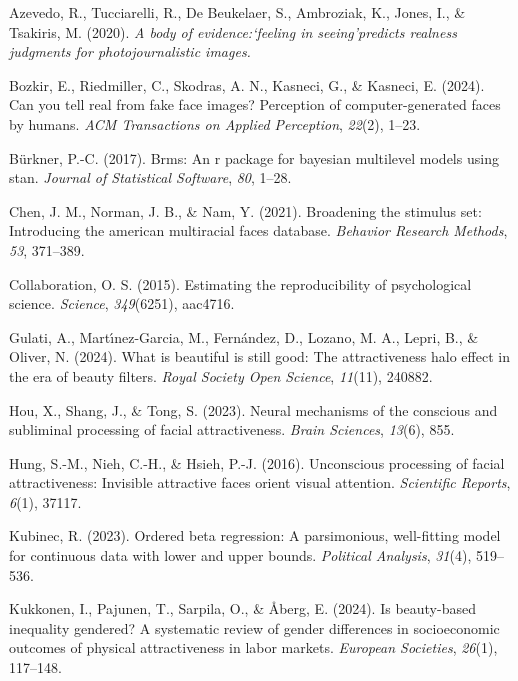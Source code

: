 \documentclass[
  jou,
  floatsintext,
  longtable,
  nolmodern,
  notxfonts,
  notimes,
  colorlinks=true,linkcolor=blue,citecolor=blue,urlcolor=blue]{apa7}
\newlength{\cslhangindent}
\newenvironment{CSLReferences}[2] %
 {\begin{list}{}{%
  \setlength{\itemindent}{0pt}
  \setlength{\leftmargin}{0pt}
  \setlength{\parsep}{0pt}
  \ifodd #1
   \setlength{\leftmargin}{\cslhangindent}
   \setlength{\itemindent}{-1\cslhangindent}
  \fi
  \setlength{\itemsep}{#2\baselineskip}}}
 {\end{list}}
\begin{document}
\label{refs}
\begin{CSLReferences}{1}{0}
Azevedo, R., Tucciarelli, R., De Beukelaer, S., Ambroziak, K., Jones,
I., \& Tsakiris, M. (2020). \emph{A body of evidence:`feeling in
seeing'predicts realness judgments for photojournalistic images.}

Bozkir, E., Riedmiller, C., Skodras, A. N., Kasneci, G., \& Kasneci, E.
(2024). Can you tell real from fake face images? Perception of
computer-generated faces by humans. \emph{ACM Transactions on Applied
Perception}, \emph{22}(2), 1--23.

Bürkner, P.-C. (2017). Brms: An r package for bayesian multilevel models
using stan. \emph{Journal of Statistical Software}, \emph{80}, 1--28.

Chen, J. M., Norman, J. B., \& Nam, Y. (2021). Broadening the stimulus
set: Introducing the american multiracial faces database. \emph{Behavior
Research Methods}, \emph{53}, 371--389.

Collaboration, O. S. (2015). Estimating the reproducibility of
psychological science. \emph{Science}, \emph{349}(6251), aac4716.

Gulati, A., Martı́nez-Garcia, M., Fernández, D., Lozano, M. A., Lepri,
B., \& Oliver, N. (2024). What is beautiful is still good: The
attractiveness halo effect in the era of beauty filters. \emph{Royal
Society Open Science}, \emph{11}(11), 240882.

Hou, X., Shang, J., \& Tong, S. (2023). Neural mechanisms of the
conscious and subliminal processing of facial attractiveness.
\emph{Brain Sciences}, \emph{13}(6), 855.

Hung, S.-M., Nieh, C.-H., \& Hsieh, P.-J. (2016). Unconscious processing
of facial attractiveness: Invisible attractive faces orient visual
attention. \emph{Scientific Reports}, \emph{6}(1), 37117.

Kubinec, R. (2023). Ordered beta regression: A parsimonious,
well-fitting model for continuous data with lower and upper bounds.
\emph{Political Analysis}, \emph{31}(4), 519--536.

Kukkonen, I., Pajunen, T., Sarpila, O., \& Åberg, E. (2024). Is
beauty-based inequality gendered? A systematic review of gender
differences in socioeconomic outcomes of physical attractiveness in
labor markets. \emph{European Societies}, \emph{26}(1), 117--148.


\end{CSLReferences}
\end{document}
